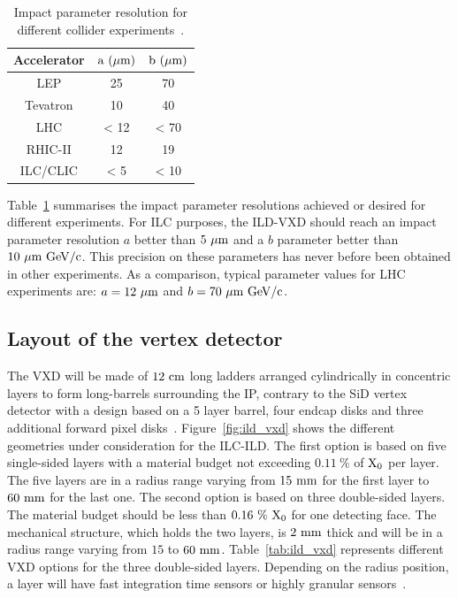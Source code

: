     \begin{table}[!tbh]
      \centering
      \begin{tabular}{ c c c}
      \hline %
      Accelerator & $\rm{a~(\mu m)}$ & $\rm{b~(\mu m)}$ \tabularnewline
      \hline %
      \hline %
      LEP & 25 & 70 \tabularnewline
      Tevatron & 10 & 40 \tabularnewline
      LHC & < 12 & < 70 \tabularnewline
      RHIC-II & 12 & 19 \tabularnewline
      ILC/CLIC & < 5 & < 10 \tabularnewline
      \hline %
      \end{tabular}
      \caption{Impact parameter resolution for different collider experiments~\cite{IGM}.}
      \label{tab:IP_colliders}
    \end{table}
    
   Table~\ref{tab:IP_colliders} summarises the impact parameter resolutions achieved or desired for different experiments.
   For \gls{ILC} purposes, the \gls{ILD}-\gls{VXD} should reach an impact parameter resolution $a$ better than $5~\rm{\mu m}$ and a $b$ parameter better than $10~\rm{\mu m~GeV/c}$. 
   This precision on these parameters has never before been obtained in other experiments.
   As a comparison, typical parameter values for \gls{LHC} experiments are: $a =  12~\rm{\mu m}$ and $b = 70~\rm{\mu m}~\rm{GeV/c}$. 

   \subsection{Layout of the vertex detector}
   \label{subsec:layout}

   The \gls{VXD} will be made of $12~\rm{cm}$ long ladders arranged cylindrically in concentric layers to form long-barrels surrounding the \gls{IP}, contrary to the \gls{SiD} vertex detector with a design based on a 5 layer barrel, four endcap disks and three additional forward pixel disks~\cite{Behnke2010}.
   Figure~\ref{fig:ild_vxd} shows the different geometries under consideration for the \gls{ILC}-\gls{ILD}.
   The first option is based on five single-sided layers with a material budget not exceeding $0.11~\%$ of $\rm{X_0}$ per layer.
   The five layers are in a radius range varying from $15~\rm{mm}$ for the first layer to $60~\rm{mm}$ for the last one.
   The second option is based on three double-sided layers.
   The material budget should be less than $0.16~\%~\rm{X_0}$ for one detecting face.
   The mechanical structure, which holds the two layers, is $2~\rm{mm}$ thick and will be in a radius range varying from $15$ to $60~\rm{mm}$.
   Table~\ref{tab:ild_vxd} represents different \gls{VXD} options for the three double-sided layers. 
   Depending on the radius position, a layer will have fast integration time sensors or highly granular sensors~\cite{Yorgos}.

